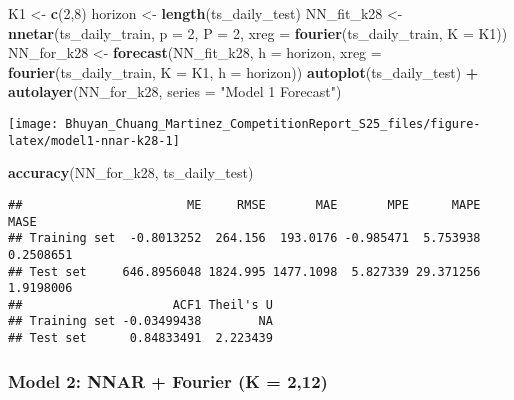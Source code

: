 \documentclass[
]{article}
\newenvironment{Shaded}{\begin{snugshade}}{\end{snugshade}}
\newcommand{\AttributeTok}[1]{\textcolor[rgb]{0.13,0.29,0.53}{#1}}
\newcommand{\DecValTok}[1]{\textcolor[rgb]{0.00,0.00,0.81}{#1}}
\newcommand{\FunctionTok}[1]{\textcolor[rgb]{0.13,0.29,0.53}{\textbf{#1}}}
\newcommand{\NormalTok}[1]{#1}
\newcommand{\OtherTok}[1]{\textcolor[rgb]{0.56,0.35,0.01}{#1}}
\newcommand{\SpecialCharTok}[1]{\textcolor[rgb]{0.81,0.36,0.00}{\textbf{#1}}}
\newcommand{\StringTok}[1]{\textcolor[rgb]{0.31,0.60,0.02}{#1}}
\begin{document}
\begin{Shaded}
\begin{Highlighting}[]
\NormalTok{K1 }\OtherTok{\textless{}{-}} \FunctionTok{c}\NormalTok{(}\DecValTok{2}\NormalTok{,}\DecValTok{8}\NormalTok{)}
\NormalTok{horizon }\OtherTok{\textless{}{-}} \FunctionTok{length}\NormalTok{(ts\_daily\_test)}
\NormalTok{NN\_fit\_k28 }\OtherTok{\textless{}{-}} \FunctionTok{nnetar}\NormalTok{(ts\_daily\_train, }\AttributeTok{p =} \DecValTok{2}\NormalTok{, }\AttributeTok{P =} \DecValTok{2}\NormalTok{, }\AttributeTok{xreg =} \FunctionTok{fourier}\NormalTok{(ts\_daily\_train, }\AttributeTok{K =}\NormalTok{ K1))}
\NormalTok{NN\_for\_k28 }\OtherTok{\textless{}{-}} \FunctionTok{forecast}\NormalTok{(NN\_fit\_k28, }\AttributeTok{h =}\NormalTok{ horizon, }\AttributeTok{xreg =} \FunctionTok{fourier}\NormalTok{(ts\_daily\_train, }\AttributeTok{K =}\NormalTok{ K1, }\AttributeTok{h =}\NormalTok{ horizon))}
\FunctionTok{autoplot}\NormalTok{(ts\_daily\_test) }\SpecialCharTok{+} \FunctionTok{autolayer}\NormalTok{(NN\_for\_k28, }\AttributeTok{series =} \StringTok{"Model 1 Forecast"}\NormalTok{)}
\end{Highlighting}
\end{Shaded}

\begin{center}\texttt{[image: Bhuyan\_Chuang\_Martinez\_CompetitionReport\_S25\_files/figure-latex/model1-nnar-k28-1]} \end{center}

\begin{Shaded}
\begin{Highlighting}[]
\FunctionTok{accuracy}\NormalTok{(NN\_for\_k28, ts\_daily\_test)}
\end{Highlighting}
\end{Shaded}

\begin{verbatim}
##                       ME     RMSE       MAE       MPE      MAPE      MASE
## Training set  -0.8013252  264.156  193.0176 -0.985471  5.753938 0.2508651
## Test set     646.8956048 1824.995 1477.1098  5.827339 29.371256 1.9198006
##                     ACF1 Theil's U
## Training set -0.03499438        NA
## Test set      0.84833491  2.223439
\end{verbatim}

\subsubsection{Model 2: NNAR + Fourier (K =
2,12)}\label{model-2-nnar-fourier-k-212}
\end{document}
